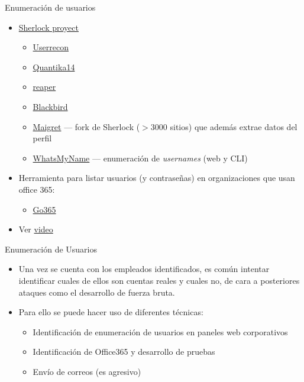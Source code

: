\documentclass[aspectratio=169,11pt]{beamer}
\begin{document}
\begin{frame}[allowframebreaks]{Enumeración de usuarios}
\small
  \begin{itemize}
  \item \href{https://sherlock-project.github.io/}{Sherlock proyect}
    \begin{itemize}
    \item \href{https://ginseg.com/comunidad/investigar-por-nombre-de-usuario/userrecon-py-localiza-perfiles-sociales-a-partir-de-nombres-de-usuario/}{Userrecon}
    \item \href{https://github.com/Quantika14/osint-suite-tools}{Quantika14}
    \item \href{https://reaper.social/}{reaper}
    \item \href{https://hakin9.org/blackbird-an-osint-tool-to-search-for-accounts-by-username-in-social-networks/}{Blackbird}
    \item \href{https://github.com/soxoj/maigret}{Maigret} --- fork de Sherlock ($>$3000 sitios) que además extrae datos del perfil
    \item \href{https://whatsmyname.app/}{WhatsMyName} --- enumeración de \emph{usernames} (web y CLI)
    \end{itemize}
  \item Herramienta para listar usuarios (y contraseñas) en organizaciones que usan office 365:
    \begin{itemize}
    \item \href{https://www.blackhatethicalhacking.com/tools/go365/}{Go365}
    \end{itemize}
  \item Ver \href{https://www.youtube.com/watch?v=t1nw1uLF9L4}{video}
  \end{itemize}
\end{frame}

\begin{frame}[allowframebreaks]{Enumeración de Usuarios}
\small
  \begin{itemize}
  \item Una vez se cuenta con los empleados identificados, es común intentar identificar cuales de ellos son cuentas reales y cuales no, de cara a posteriores ataques como el desarrollo de fuerza bruta.
  \item Para ello se puede hacer uso de diferentes técnicas:
  \begin{itemize}

  \item Identificación de enumeración de usuarios en paneles web corporativos
  \item Identificación de Office365 y desarrollo de pruebas
  \item Envío de correos (es agresivo)
  \end{itemize}
  \end{itemize}
\end{frame}
\end{document}
